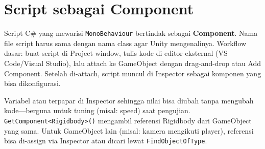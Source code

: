 \section{Script sebagai Component}

Script C\# yang mewarisi \texttt{MonoBehaviour} bertindak sebagai \textbf{Component}. Nama file script harus sama dengan nama class agar Unity mengenalinya. Workflow dasar: buat script di Project window, tulis kode di editor eksternal (VS Code/Visual Studio), lalu attach ke GameObject dengan drag-and-drop atau Add Component. Setelah di-attach, script muncul di Inspector sebagai komponen yang bisa dikonfigurasi.

Variabel  atau \keyword{[SerializeField]} terpapar di Inspector sehingga nilai bisa diubah tanpa mengubah kode---berguna untuk tuning (misal: speed) saat pengujian. \texttt{GetComponent<Rigidbody>()} mengambil referensi Rigidbody dari GameObject yang sama. Untuk GameObject lain (misal: kamera mengikuti player), referensi bisa di-assign via Inspector atau dicari lewat \texttt{FindObjectOfType}.
